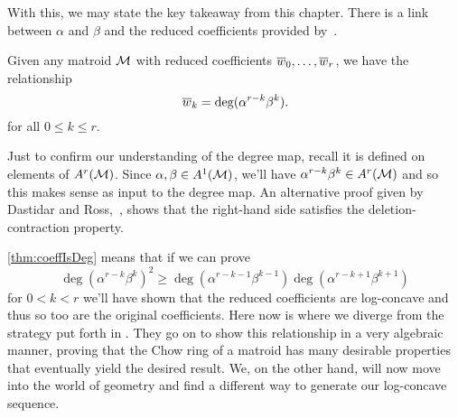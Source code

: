 \documentclass[12pt,oneside]{../../sfsuthesis}
\begin{document}
With this, we may state the key takeaway from this chapter.
There is a link between \( \alpha \) and \( \beta \) and the reduced coefficients provided by~\cite[Proposition~9.5]{adiprasitoHodgeTheoryCombinatorial2018}.
\begin{proposition}\th\label{thm:coeffIsDeg}
    Given any matroid \( \mathcal{M} \) with reduced coefficients \( \overline{w}_0, \dots, \overline{w}_r \), we have the relationship
    \[
        \overline{w}_k = \deg(\alpha^{r-k}\beta^k).
    \]
    for all \( 0 \leq k \leq r \).
\end{proposition}
Just to confirm our understanding of the degree map, recall it is defined on elements of \( A^r(\mathcal{M}) \).
Since \( \alpha, \beta \in A^1(\mathcal{M})\), we'll have \( \alpha^{r-k}\beta^k \in A^r(\mathcal{M}) \) and so this makes sense as input to the degree map.
An alternative proof given by Dastidar and Ross,~\cite[Proposition~3.11]{dastidarMatroidPsiClasses2021}, shows that the right-hand side satisfies the deletion-contraction property.

\th\ref{thm:coeffIsDeg} means that if we can prove
\[
    \deg(\alpha^{r-k}\beta^k)^2 \geq \deg(\alpha^{r-k-1}\beta^{k-1}) \deg(\alpha^{r-k+1}\beta^{k+1})
\]
for \( 0 < k < r \) we'll have shown that the reduced coefficients are log-concave and thus so too are the original coefficients.
Here now is where we diverge from the strategy put forth in \cite{adiprasitoHodgeTheoryCombinatorial2018}.
They go on to show this relationship in a very algebraic manner, proving that the Chow ring of a matroid has many desirable properties that eventually yield the desired result.
We, on the other hand, will now move into the world of geometry and find a different way to generate our log-concave sequence.
\end{document}
